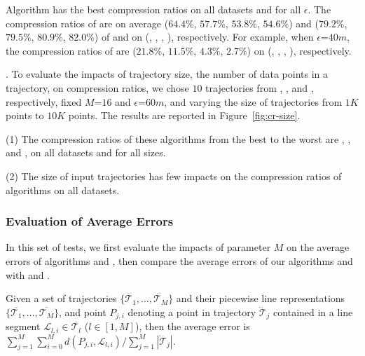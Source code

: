  Algorithm \cista has {the best} compression ratios on all datasets and for all $\epsilon$.
%
The compression ratios of \cista are on average ($64.4\%$, $57.7\%$, $53.8\%$, {$54.6\%$}) and ($79.2\%$, $79.5\%$, $80.9\%$, $82.0\%$) of \squishe and \dps on (\truck, \sercar, \geolife, \pricar), respectively.
%
For example, when $\epsilon$=$40m$, the compression ratios of \cista are ($21.8\%$, $11.5\%$, $4.3\%$, $2.7\%$) on (\truck, \sercar, \geolife, \pricar), respectively.



.
To evaluate the impacts of trajectory size, \ie the number of data points in a trajectory, on compression ratios,
we chose {$10$} trajectories from \truck, \sercar, \geolife and \pricar, respectively,
fixed {$M$=$16$} and $\epsilon$=$60m$, and varying the size  of trajectories from $1K$ points to $10K$ points.
%
The results are reported in Figure~\ref{fig:cr-size}.

\ni(1) The compression ratios of these algorithms from the best to the worst are \cista, \dps, \cist and \squishe, on all datasets and for all sizes. %

\ni(2) The size of input trajectories has few impacts on the compression ratios of \lsa algorithms on all datasets.





\subsubsection{Evaluation of Average Errors}
In this set of tests, we first evaluate the impacts of parameter $M$ on the average errors of algorithms \cist and \cista, then compare the average errors of our algorithms \cist and \cista with \dps and \squishe.

Given a set of trajectories $\{\dddot{\mathcal{T}_1}, \ldots, \dddot{\mathcal{T}_M}\}$ and their piecewise line representations $\{\overline{\mathcal{T}_1}, \ldots, \overline{\mathcal{T}_M}\}$, and point $P_{j,i}$ denoting
a point in trajectory $\dddot{\mathcal{T}}_j$ contained in a line segment $\mathcal{L}_{l,i}\in\overline{\mathcal{T}_l}$ ($l\in[1,M]$),
then the average error is $\sum_{j=1}^{M}\sum_{i=0}^{M} d(P_{j,i},
\mathcal{L}_{l,i})/\sum_{j=1}^{M}{|\dddot{\mathcal{T}}_j |}$.


